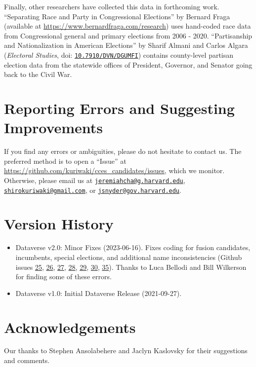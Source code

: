 \documentclass[12pt]{article}
\begin{document}
Finally, other researchers have collected this data in forthcoming work. ``Separating Race and Party in Congressional
Elections'' by Bernard Fraga (available at \url{https://www.bernardfraga.com/research}) uses hand-coded race data from Congressional general and primary elections from 2006 - 2020. ``Partisanship and Nationalization in American Elections'' by Sharif Almani and Carlos Algara (\emph{Electoral Studies}, doi: \href{https://doi.org/10.7910/DVN/DGUMFI}{\texttt{10.7910/DVN/DGUMFI}}) contains county-level partisan election data from the statewide offices of President, Governor, and Senator going back to the Civil War.

\section{Reporting Errors and Suggesting Improvements}

If you find any errors or ambiguities, please do not hesitate to contact us. The preferred method is to open a ``Issue'' at \url{https://github.com/kuriwaki/cces_candidates/issues}, which we monitor. Otherwise, please email us at \href{mailto:jeremiahcha@g.harvard.edu}{\texttt{jeremiahcha@g.harvard.edu}}, \href{mailto:shirokuriwaki@gmail.com}{\texttt{shirokuriwaki@gmail.com}}, or \href{mailto:jsnyder@gov.harvard.edu}{\texttt{jsnyder@gov.harvard.edu}}.



\section{Version History}

\begin{itemize}
\item Dataverse v2.0: Minor Fixes (2023-06-16). Fixes coding for fusion candidates, incumbents, special elections, and additional name inconsistencies (Github issues \href{https://github.com/kuriwaki/cces_candidates/issues/25}{25}, \href{https://github.com/kuriwaki/cces_candidates/issues/26}{26}, \href{https://github.com/kuriwaki/cces_candidates/issues/27}{27}, \href{https://github.com/kuriwaki/cces_candidates/issues/28}{28}, \href{https://github.com/kuriwaki/cces_candidates/issues/29}{29}, \href{https://github.com/kuriwaki/cces_candidates/issues/30}{30},
\href{https://github.com/kuriwaki/cces_candidates/issues/35}{35}). Thanks to Luca Bellodi and Bill Wilkerson for finding some of these errors.
\item Dataverse v1.0: Initial Dataverse Release (2021-09-27).
\end{itemize}

\section{Acknowledgements}

Our thanks to Stephen Ansolabehere and Jaclyn Kaslovsky for their suggestions and comments.
\end{document}

